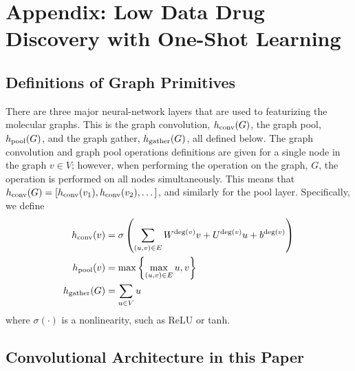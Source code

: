 \section{Appendix: Low Data Drug Discovery with One-Shot Learning}

\subsection{Definitions of Graph Primitives}

There are three major neural-network layers that are used to featurizing the molecular graphs. This is the graph convolution, $h_{\rm conv}(G)$, the graph pool, $h_{\rm pool}(G)$, and the graph gather, $h_{\rm gather}(G)$, all defined below. The graph convolution and graph pool operations definitions are given for a single node in the graph $v\in V$; however, when performing the operation on the graph, $G$, the operation is performed on all nodes simultaneously. This means that $h_{\rm conv}(G) = [h_{\rm conv}(v_1), h_{\rm conv}(v_2),\dots]$, and similarly for the pool layer. Specifically, we define
\begin{align*}
h_{\rm{conv}}(v) &= \sigma\left(\sum\limits_{(u,v)\in E} W^{{\rm{deg}}(v)}v + U^{{\rm{deg}}(v)}u + b^{{\rm{deg}}(v)}\right) \\
h_{\rm{pool}}(v) &= \max\left\{\max\limits_{(u,v)\in E} u, v\right \} \\
h_{\rm{gather}}(G) &= \sum_{u\in V} u\\
\end{align*}
where $\sigma(\cdot)$ is a nonlinearity, such as ReLU or tanh.

\subsection{Convolutional Architecture in this Paper}

